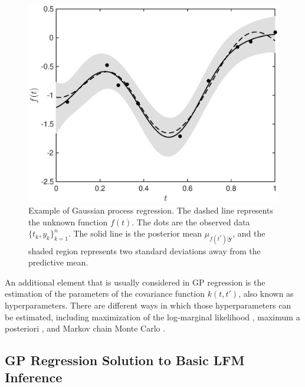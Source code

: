 \documentclass[journal]{IEEEtran}
\newcommand{\simo}[1]{{\color{red}#1}}
\begin{document}
\begin{figure}[!t]
\centering
\includegraphics[width=\columnwidth]{toyGPoutput}
\caption{Example of Gaussian process regression.  The dashed line represents the unknown function $f(t)$. The dots are
  the observed data $\{t_k, y_k\}_{k=1}^n$. The solid line is the posterior mean $\mu_{f(t^*)|\mathbf{y}}$, and the
  shaded region represents two standard deviations away from the predictive mean.}
\label{reg_ex}
\end{figure}

An additional element that is usually considered in GP regression is the estimation of the parameters of the covariance
function $k(t,t')$, also known as hyperparameters. There are different ways in which those hyperparameters can be
estimated, including maximization of the log-marginal likelihood \cite{Rasmussen+Williams:2006}, maximum a posteriori
\cite{Murphy:2012:MLP}, and Markov chain Monte Carlo \cite{FilipponeML13}.

\subsection{GP Regression Solution to Basic LFM Inference}\label{sec:gp:regression:lfm}
%
\end{document}
